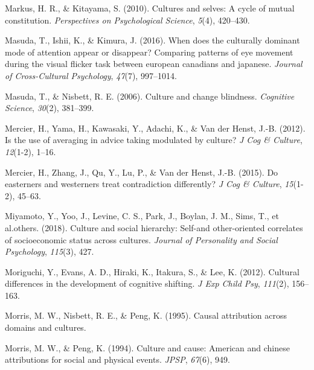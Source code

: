 \documentclass[
  man,floatsintext]{apa6}
\newlength{\cslhangindent}
\newlength{\cslentryspacingunit} %
\newenvironment{CSLReferences}[2] %
 {%
  \setlength{\parindent}{0pt}
  \ifodd #1
  \let\oldpar\par
  \def\par{\hangindent=\cslhangindent\oldpar}
  \fi
  \setlength{\parskip}{#2\cslentryspacingunit}
 }%
 {}
\begin{document}
\begin{CSLReferences}{1}{0}
\leavevmode{}%
Markus, H. R., \& Kitayama, S. (2010). Cultures and selves: A cycle of mutual constitution. \emph{Perspectives on Psychological Science}, \emph{5}(4), 420--430.

\leavevmode{}%
Masuda, T., Ishii, K., \& Kimura, J. (2016). When does the culturally dominant mode of attention appear or disappear? Comparing patterns of eye movement during the visual flicker task between european canadians and japanese. \emph{Journal of Cross-Cultural Psychology}, \emph{47}(7), 997--1014.

\leavevmode{}%
Masuda, T., \& Nisbett, R. E. (2006). Culture and change blindness. \emph{Cognitive Science}, \emph{30}(2), 381--399.

\leavevmode{}%
Mercier, H., Yama, H., Kawasaki, Y., Adachi, K., \& Van der Henst, J.-B. (2012). Is the use of averaging in advice taking modulated by culture? \emph{J Cog \& Culture}, \emph{12}(1-2), 1--16.

\leavevmode{}%
Mercier, H., Zhang, J., Qu, Y., Lu, P., \& Van der Henst, J.-B. (2015). Do easterners and westerners treat contradiction differently? \emph{J Cog \& Culture}, \emph{15}(1-2), 45--63.

\leavevmode{}%
Miyamoto, Y., Yoo, J., Levine, C. S., Park, J., Boylan, J. M., Sims, T., et al.others. (2018). Culture and social hierarchy: Self-and other-oriented correlates of socioeconomic status across cultures. \emph{Journal of Personality and Social Psychology}, \emph{115}(3), 427.

\leavevmode{}%
Moriguchi, Y., Evans, A. D., Hiraki, K., Itakura, S., \& Lee, K. (2012). Cultural differences in the development of cognitive shifting. \emph{J Exp Child Psy}, \emph{111}(2), 156--163.

\leavevmode{}%
Morris, M. W., Nisbett, R. E., \& Peng, K. (1995). Causal attribution across domains and cultures.

\leavevmode{}%
Morris, M. W., \& Peng, K. (1994). Culture and cause: American and chinese attributions for social and physical events. \emph{JPSP}, \emph{67}(6), 949.


\end{CSLReferences}
\end{document}
